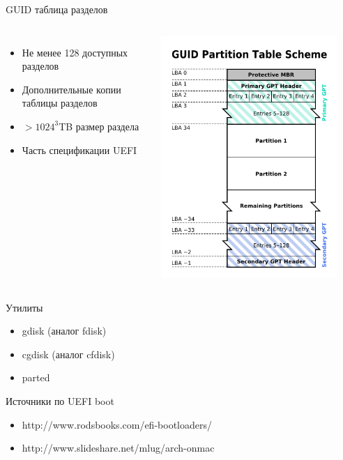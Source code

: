 \begin{frame}{GUID таблица разделов}

   \begin{columns}
      \begin{itemize}
        \item{Не менее 128 доступных разделов}
        \item{Дополнительные копии таблицы разделов}
        \item{$>1024^3$TB размер раздела}
        \item{Часть спецификации UEFI}
      \end{itemize}
      \includegraphics[width=0.9\textwidth]{../../slides/disk/gpt.png}
  \end{columns}
  \begin{center}
   \Large Утилиты
  \end{center}
  \begin{itemize}
    \item gdisk (аналог fdisk)
    \item cgdisk (аналог cfdisk)
    \item parted
  \end{itemize}
\end{frame}

\begin{frame}{Источники по UEFI boot}
  \begin{itemize}
    \item http://www.rodsbooks.com/efi-bootloaders/
    \item http://www.slideshare.net/mlug/arch-onmac 
  \end{itemize}
\end{frame}
